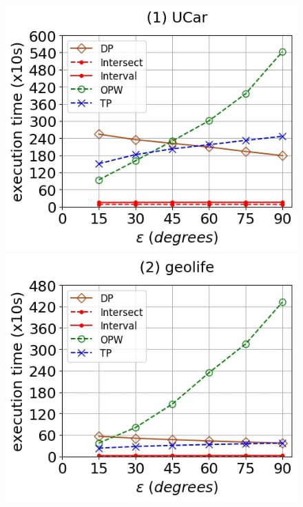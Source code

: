 {\begin{figure}[tb!]
	\centering
	\includegraphics[scale=0.250]{Figures/Exp-DAD-time-epsilon-service.jpg} 	\hspace{0.5ex}
	\includegraphics[scale=0.250]{Figures/Exp-DAD-time-epsilon-geolife.jpg}	\hspace{0.5ex}

\end{figure}}
